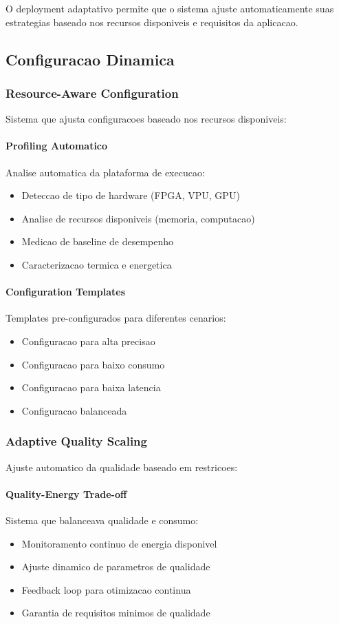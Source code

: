O deployment adaptativo permite que o sistema ajuste automaticamente suas estrategias baseado nos recursos disponiveis e requisitos da aplicacao.

\subsection{Configuracao Dinamica}

\subsubsection{Resource-Aware Configuration}
Sistema que ajusta configuracoes baseado nos recursos disponiveis:

\paragraph{Profiling Automatico}
Analise automatica da plataforma de execucao:
\begin{itemize}
    \item Deteccao de tipo de hardware (FPGA, VPU, GPU)
    \item Analise de recursos disponiveis (memoria, computacao)
    \item Medicao de baseline de desempenho
    \item Caracterizacao termica e energetica
\end{itemize}

\paragraph{Configuration Templates}
Templates pre-configurados para diferentes cenarios:
\begin{itemize}
    \item Configuracao para alta precisao
    \item Configuracao para baixo consumo
    \item Configuracao para baixa latencia
    \item Configuracao balanceada
\end{itemize}

\subsubsection{Adaptive Quality Scaling}
Ajuste automatico da qualidade baseado em restricoes:

\paragraph{Quality-Energy Trade-off}
Sistema que balanceava qualidade e consumo:
\begin{itemize}
    \item Monitoramento continuo de energia disponivel
    \item Ajuste dinamico de parametros de qualidade
    \item Feedback loop para otimizacao continua
    \item Garantia de requisitos minimos de qualidade
\end{itemize}

